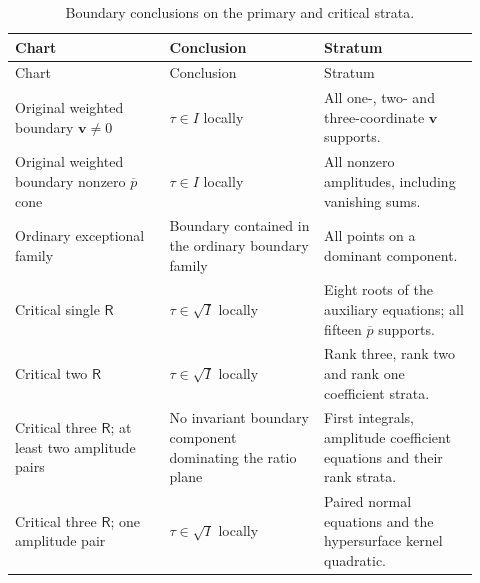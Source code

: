 \begin{longtable}{@{}>{\raggedright\arraybackslash}p{0.305\linewidth}>{\raggedright\arraybackslash}p{0.305\linewidth}>{\raggedright\arraybackslash}p{0.305\linewidth}@{}}

\caption{Boundary conclusions on the primary and critical strata.}\label{supp:tab:r3-primary-ideals}\\
\toprule Chart & Conclusion & Stratum\\\midrule\endfirsthead
\toprule Chart & Conclusion & Stratum\\\midrule\endhead

Original weighted boundary $\boldsymbol v\ne0$ & $\tau\in I$ locally & All one-, two- and three-coordinate $\boldsymbol v$ supports.\\

Original weighted boundary nonzero $\overline p$ cone & $\tau\in I$ locally & All nonzero amplitudes, including vanishing sums.\\

Ordinary exceptional family & Boundary contained in the ordinary boundary family & All points on a dominant component.\\

Critical single $\mathsf R$ & $\tau\in\sqrt I$ locally & Eight roots of the auxiliary equations; all fifteen $\overline p$ supports.\\

Critical two $\mathsf R$ & $\tau\in\sqrt I$ locally & Rank three, rank two and rank one coefficient strata.\\

Critical three $\mathsf R$; at least two amplitude pairs
 & No invariant boundary component dominating the ratio plane
 & First integrals, amplitude coefficient equations and their rank strata.\\

Critical three $\mathsf R$; one amplitude pair
 & $\tau\in\sqrt I$ locally
 & Paired normal equations and the hypersurface kernel quadratic.\\

\bottomrule\end{longtable}


